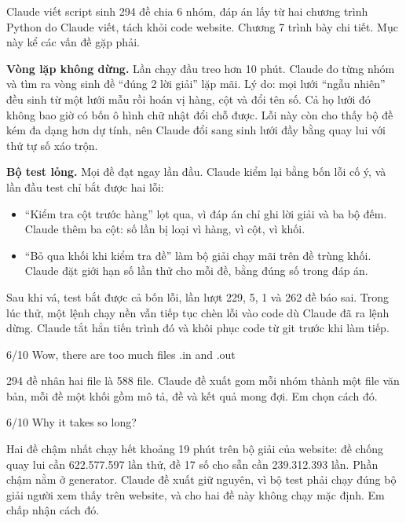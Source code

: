 Claude viết script sinh 294 đề chia 6 nhóm, đáp án lấy từ hai chương trình Python do Claude viết, tách khỏi code website. Chương 7 trình bày chi tiết. Mục này kể các vấn đề gặp phải.

\textbf{Vòng lặp không dừng.} Lần chạy đầu treo hơn 10 phút. Claude đo từng nhóm và tìm ra vòng sinh đề ``đúng 2 lời giải'' lặp mãi. Lý do: mọi lưới ``ngẫu nhiên'' đều sinh từ một lưới mẫu rồi hoán vị hàng, cột và đổi tên số. Cả họ lưới đó không bao giờ có bốn ô hình chữ nhật đổi chỗ được. Lỗi này còn cho thấy bộ đề kém đa dạng hơn dự tính, nên Claude đổi sang sinh lưới đầy bằng quay lui với thứ tự số xáo trộn.

\textbf{Bộ test lỏng.} Mọi đề đạt ngay lần đầu. Claude kiểm lại bằng bốn lỗi cố ý, và lần đầu test chỉ bắt được hai lỗi:

\begin{itemize}
  \item ``Kiểm tra cột trước hàng'' lọt qua, vì đáp án chỉ ghi lời giải và ba bộ đếm. Claude thêm ba cột: số lần bị loại vì hàng, vì cột, vì khối.
  \item ``Bỏ qua khối khi kiểm tra đề'' làm bộ giải chạy mãi trên đề trùng khối. Claude đặt giới hạn số lần thử cho mỗi đề, bằng đúng số trong đáp án.
\end{itemize}

Sau khi vá, test bắt được cả bốn lỗi, lần lượt 229, 5, 1 và 262 đề báo sai. Trong lúc thử, một lệnh chạy nền vẫn tiếp tục chèn lỗi vào code dù Claude đã ra lệnh dừng. Claude tắt hẳn tiến trình đó và khôi phục code từ git trước khi làm tiếp.

\begin{promptbox}{6/10}
Wow, there are too much files .in and .out
\end{promptbox}

294 đề nhân hai file là 588 file. Claude đề xuất gom mỗi nhóm thành một file văn bản, mỗi đề một khối gồm mô tả, đề và kết quả mong đợi. Em chọn cách đó.

\begin{promptbox}{6/10}
Why it takes so long?
\end{promptbox}

Hai đề chậm nhất chạy hết khoảng 19 phút trên bộ giải của website: đề chống quay lui cần 622.577.597 lần thử, đề 17 số cho sẵn cần 239.312.393 lần. Phần chậm nằm ở generator. Claude đề xuất giữ nguyên, vì bộ test phải chạy đúng bộ giải người xem thấy trên website, và cho hai đề này không chạy mặc định. Em chấp nhận cách đó.

